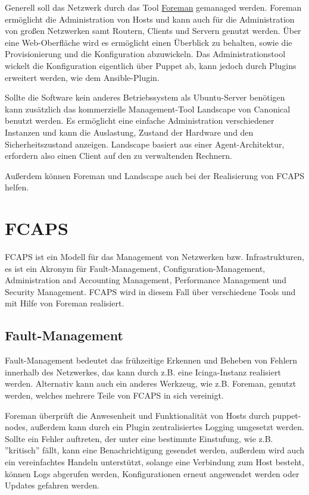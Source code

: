 Generell soll das Netzwerk durch das Tool \href{www.theforeman.org}{Foreman} gemanaged werden. Foreman ermöglicht die Administration von Hosts und kann auch für die Administration von großen Netzwerken samt Routern, Clients und Servern genutzt werden. Über eine Web-Oberfläche wird es ermöglicht einen Überblick zu behalten, sowie die Provisionierung und die Konfiguration abzuwickeln.
Das Administrationstool wickelt die Konfiguration eigentlich über Puppet ab, kann jedoch durch Plugins erweitert werden, wie dem Ansible-Plugin. 

Sollte die Software kein anderes Betriebssystem als Ubuntu-Server benötigen kann zusätzlich das kommerzielle Management-Tool Landscape von Canonical benutzt werden. Es ermöglicht eine einfache Administration verschiedener Instanzen und kann die Auslastung, Zustand der Hardware und den Sicherheitszustand anzeigen. Landscape basiert aus einer Agent-Architektur, erfordern also einen Client auf den zu verwaltenden Rechnern.

Außerdem können Foreman und Landscape auch bei der Realisierung von FCAPS helfen.

\section{FCAPS}
FCAPS ist ein Modell für das Management von Netzwerken bzw. Infrastrukturen, es ist ein Akronym für Fault-Management, Configuration-Management, Administration and Accounting Management, Performance Management und Security Management. FCAPS wird in diesem Fall über verschiedene Tools und mit Hilfe von Foreman realisiert.


\subsection{Fault-Management}
Fault-Management bedeutet das frühzeitige Erkennen und Beheben von Fehlern innerhalb des Netzwerkes, das kann durch z.B. eine Icinga-Instanz realisiert werden. Alternativ kann auch ein anderes Werkzeug, wie z.B. Foreman, genutzt werden, welches mehrere Teile von FCAPS in sich vereinigt.

Foreman überprüft die Anwesenheit und Funktionalität von Hosts durch puppet-nodes, außerdem kann durch ein Plugin zentralisiertes Logging umgesetzt werden. Sollte ein Fehler auftreten, der unter eine bestimmte Einstufung, wie z.B. ''kritisch'' fällt, kann eine Benachrichtigung gesendet werden, außerdem wird auch ein vereinfachtes Handeln unterstützt, solange eine Verbindung zum Host besteht, können Logs abgerufen werden, Konfigurationen erneut angewendet werden oder Updates gefahren werden.

